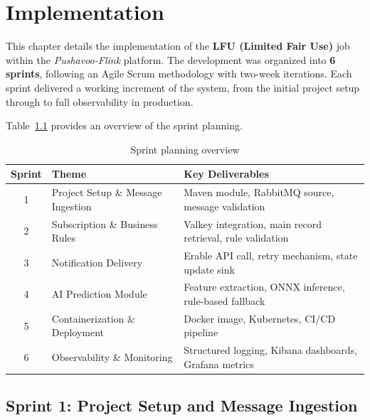 \usepackage{booktabs}
\usepackage{listings}
\usepackage{tikz}%

\chapter{Implementation}
\label{chap:implementation}

This chapter details the implementation of the \textbf{LFU (Limited Fair Use)} job within the \textit{Pushavoo-Flink} platform. The development was organized into \textbf{6 sprints}, following an Agile Scrum methodology with two-week iterations. Each sprint delivered a working increment of the system, from the initial project setup through to full observability in production.

Table~\ref{tab:sprint-overview} provides an overview of the sprint planning.

\begin{table}[H]
    \centering
    \caption{Sprint planning overview}
    \label{tab:sprint-overview}
    \begin{tabularx}{\textwidth}{c l X}
\toprule
\textbf{Sprint} & \textbf{Theme} & \textbf{Key Deliverables} \\
\midrule
1 & Project Setup \& Message Ingestion & Maven module, RabbitMQ source, message validation \\
2 & Subscription \& Business Rules & Valkey integration, main record retrieval, rule validation \\
3 & Notification Delivery & Erable API call, retry mechanism, state update sink \\
4 & AI Prediction Module & Feature extraction, ONNX inference, rule-based fallback \\
5 & Containerization \& Deployment & Docker image, Kubernetes, CI/CD pipeline \\
6 & Observability \& Monitoring & Structured logging, Kibana dashboards, Grafana metrics \\
\bottomrule
    \end{tabularx}
\end{table}

\section{Sprint 1: Project Setup and Message Ingestion}
\label{sec:sprint1}


